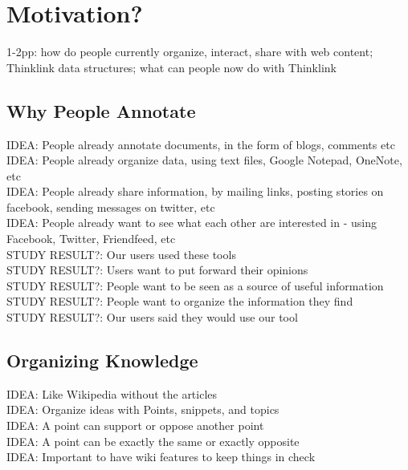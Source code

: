 \documentclass{sig-alt-release2}
\newcommand{\idea}[1]{{\color{blue} IDEA: #1}\\}
\newcommand{\studyresult}[1]{{\color{red} STUDY RESULT?: #1}\\}
\begin{document}

\section{Motivation?}
1-2pp: 
how do people currently organize, interact, share with web content; 
Thinklink data structures; 
what can people now do with Thinklink

\subsection{Why People Annotate}

\idea{People already annotate documents, in the form of blogs, comments etc}

\idea{People already organize data, using text files, Google Notepad, OneNote, etc}

\idea{People already share information, by mailing links, posting stories on facebook, sending messages on twitter, etc}

\idea{People already want to see what each other are interested in - using Facebook, Twitter, Friendfeed, etc}

\studyresult{Our users used these tools}

\studyresult{Users want to put forward their opinions}

\studyresult{People want to be seen as a source of useful information}

\studyresult{People want to organize the information they find}

\studyresult{Our users said they would use our tool}



\subsection{Organizing Knowledge}

\idea{Like Wikipedia without the articles}

\idea{Organize ideas with Points, snippets, and topics}

\idea{A point can support or oppose another point}

\idea{A point can be exactly the same or exactly opposite}

\idea{Important to have wiki features to keep things in check}
\end{document}
